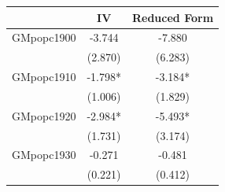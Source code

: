  \begin{tabular}{l*{2}{c}} \toprule
                &\multicolumn{1}{c}{IV}&\multicolumn{1}{c}{Reduced Form}\\
\midrule
GMpopc1900      &   -3.744   &   -7.880   \\
                &  (2.870)   &  (6.283)   \\
\addlinespace
GMpopc1910      &   -1.798*  &   -3.184*  \\
                &  (1.006)   &  (1.829)   \\
\addlinespace
GMpopc1920      &   -2.984*  &   -5.493*  \\
                &  (1.731)   &  (3.174)   \\
\addlinespace
GMpopc1930      &   -0.271   &   -0.481   \\
                &  (0.221)   &  (0.412)   \\
 \bottomrule \end{tabular}
